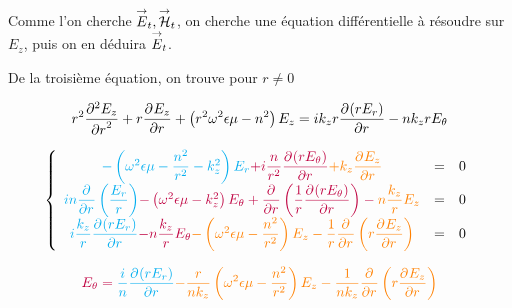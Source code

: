 Comme l'on cherche $\vE_t, \vH_t$, on cherche une équation différentielle à résoudre sur $E_z$, puis on en déduira $\vE_t$.

De la troisième  équation, on trouve pour $r\not=0$

\begin{equation}
r^2 \ddr[2]{r}{E_z} + r\ddr{r}{E_z} + \left(r^2\w^2\eps\mu - n^2\right)E_z =ik_zr\ddr{r}{(rE_r)} -  nk_zrE_\theta
\end{equation}


\begin{equation}
    \left\lbrace
    \begin{array}{ccc}
        \color{cyan}{-\left(\w^2\eps\mu -\frac{n^2}{r^2}  - k_z^2\right)E_r}  \color{purple}{+i\frac{n}{r^2}\ddr{r}{(rE_\theta)}}  \color{orange}{+k_z\ddr{r}{E_z}} & = & 0
        \\
        \color{cyan}{in\ddr{r}{}\left(\frac{E_r}{r}\right)} \color{purple}{-\left(\w^2\eps\mu - k_z^2\right)E_\theta + \ddr{r}{}\left(\frac{1}{r}\ddr{r}{(rE_\theta)}\right)}  - \color{orange}{n\frac{k_z}{r}E_z} & = & 0
        \\
        \color{cyan}{i\frac{k_z}{r}\ddr{r}{(rE_r)}}  \color{purple}{- n\frac{k_z}{r}E_\theta}  \color{orange}{-\left(\w^2\eps\mu - \frac{n^2}{r^2} \right)E_z - \frac{1}{r}\ddr{r}{}\left(r\ddr{r}{E_z}\right)} & = & 0
    \end{array}
    \right.
\end{equation}

\begin{equation}
       \color{purple}{E_\theta} = \color{cyan}{\frac{i}{n}\ddr{r}{(rE_r)}}  \color{orange}{-\frac{r}{nk_z}\left(\w^2\eps\mu - \frac{n^2}{r^2} \right)E_z - \frac{1}{nk_z}\ddr{r}{}\left(r\ddr{r}{E_z}\right)}
\end{equation}
